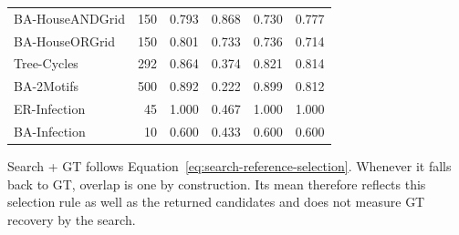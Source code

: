 \begin{table}[htbp]
\begin{tabular*}{\textwidth}{@{\extracolsep{\fill}}lr rrrr@{}}
BA-HouseANDGrid & 150 & 0.793 & 0.868 & 0.730 & 0.777 \\
BA-HouseORGrid & 150 & 0.801 & 0.733 & 0.736 & 0.714 \\
\addlinespace
Tree-Cycles & 292 & 0.864 & 0.374 & 0.821 & 0.814 \\
BA-2Motifs & 500 & 0.892 & 0.222 & 0.899 & 0.812 \\
ER-Infection & 45 & 1.000 & 0.467 & 1.000 & 1.000 \\
BA-Infection & 10 & 0.600 & 0.433 & 0.600 & 0.600 \\
\bottomrule
\end{tabular*}
\par\vspace{3pt}
\parbox{\textwidth}{\scriptsize
Search + GT follows Equation~\ref{eq:search-reference-selection}.
Whenever it falls back to GT, overlap is one by construction.
Its mean therefore reflects this selection rule as well as the returned
candidates and does not measure GT recovery by the search.}
\end{table}
